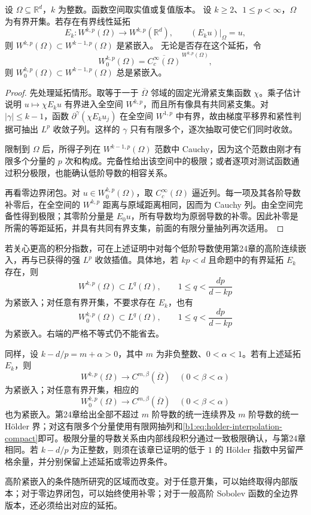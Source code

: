 \begin{proposition}\label{b1:prop:rellich-higher-order}
设 \(\Omega\subseteq\mathbb R^d\)，\(k\) 为整数。函数空间取实值或复值版本。
设 \(k\ge2\)、\(1\le p<\infty\)，\(\Omega\) 为有界开集。若存在有界线性延拓
\[
 E_k:W^{k,p}(\Omega)\longrightarrow W^{k,p}(\mathbb R^d),
 \qquad (E_ku)|_\Omega=u,
\]
则 \(W^{k,p}(\Omega)\subset W^{k-1,p}(\Omega)\) 是紧嵌入。
无论是否存在这个延拓，令
\[
 W_0^{k,p}(\Omega)
 =\overline{C_c^\infty(\Omega)}^{\,W^{k,p}(\Omega)},
\]
则 \(W_0^{k,p}(\Omega)\subset W^{k-1,p}(\Omega)\) 总是紧嵌入。
\end{proposition}
\begin{proof}
先处理延拓情形。取等于一于 \(\overline\Omega\) 邻域的固定光滑紧支集函数 \(\chi\)。乘子估计说明 \(u\mapsto\chi E_ku\) 有界进入全空间 \(W^{k,p}\)，而且所有像具有共同紧支集。对 \(|\gamma|\le k-1\)，函数 \(\partial^\gamma(\chi E_ku_j)\) 在全空间 \(W^{1,p}\) 中有界，故由梯度平移界和紧性判据可抽出 \(L^p\) 收敛子列。这样的 \(\gamma\) 只有有限多个，逐次抽取可使它们同时收敛。

限制到 \(\Omega\) 后，所得子列在 \(W^{k-1,p}(\Omega)\) 范数中 Cauchy，因为这个范数由刚才有限多个分量的 \(p\) 次和构成。完备性给出该空间中的极限；或者逐项对测试函数通过积分极限，也能确认低阶导数的相容关系。

再看零边界闭包。对 \(u\in W_0^{k,p}(\Omega)\)，取 \(C_c^\infty(\Omega)\) 逼近列。每一项及其各阶导数补零后，在全空间的 \(W^{k,p}\) 距离与原域距离相同，因而为 Cauchy 列。由全空间完备性得到极限；其零阶分量是 \(E_0u\)，所有导数均为原弱导数的补零。因此补零是所需的等距延拓，并具有共同有界支集，前面的有限分量抽列再次适用。
\end{proof}

若关心更高的积分指数，可在上述证明中对每个低阶导数使用第24章的高阶连续嵌入，再与已获得的强 \(L^p\) 收敛插值。具体地，若 \(kp<d\) 且命题中的有界延拓 \(E_k\) 存在，则
\[
 W^{k,p}(\Omega)\subset L^q(\Omega),
 \qquad 1\le q<\frac{dp}{d-kp}
\]
为紧嵌入；对任意有界开集，不要求存在 \(E_k\)，也有
\[
 W_0^{k,p}(\Omega)\subset L^q(\Omega),
 \qquad 1\le q<\frac{dp}{d-kp}
\]
为紧嵌入。右端的严格不等式仍不能省去。

\ProseParagraphBreak

同样，设 \(k-d/p=m+\alpha>0\)，其中 \(m\) 为非负整数、\(0<\alpha<1\)。若有上述延拓 \(E_k\)，则
\[
 W^{k,p}(\Omega)\longrightarrow C^{m,\beta}(\overline\Omega)
 \quad(0<\beta<\alpha)
\]
为紧嵌入；对任意有界开集，相应的
\[
 W_0^{k,p}(\Omega)\longrightarrow C^{m,\beta}(\overline\Omega)
 \quad(0<\beta<\alpha)
\]
也为紧嵌入。第24章给出全部不超过 \(m\) 阶导数的统一连续界及 \(m\) 阶导数的统一 Hölder 界；对这有限多个分量使用有限网抽列和\eqref{b1:eq:holder-interpolation-compact}即可。极限分量的导数关系由内部线段积分通过一致极限确认，与第24章相同。若 \(k-d/p\) 为正整数，则须在该章已证明的低于 \(1\) 的 Hölder 指数中另留严格余量，并分别保留上述延拓或零边界条件。

\ProseParagraphBreak

高阶紧嵌入的条件随所研究的区域而改变。对于任意开集，可以始终取得内部版本；对于零边界闭包，可以始终使用补零；对于一般高阶 Sobolev 函数的全边界版本，还必须给出对应的延拓。
